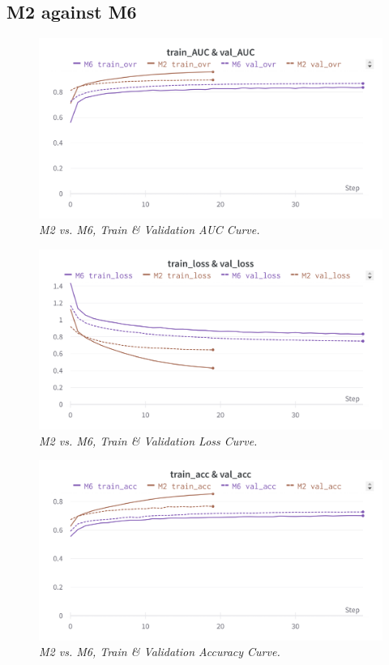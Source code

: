 \subsection{M2 against M6}

\begin{figure}[H]
  \centering
  \includegraphics[width=\textwidth]{imatges/results/AUCM2M6.png}
  \caption[M2 vs. M6, Train \& Validation AUC Curve]{\textit{M2 vs. M6, Train \& Validation AUC Curve. }}
\end{figure}

\newpage

\begin{figure}[H]
  \centering
  \includegraphics[width=\textwidth]{imatges/results/LossM2M6.png}
  \caption[M2 vs. M6, Train \& Validation Loss Curve]{\textit{M2 vs. M6, Train \& Validation Loss Curve. }}
\end{figure}


\begin{figure}[H]
  \centering
  \includegraphics[width=\textwidth]{imatges/results/AccM2M6.png}
  \caption[M2 vs. M6, Train \& Validation Accuracy Curve]{\textit{M2 vs. M6, Train \& Validation Accuracy Curve. }}
\end{figure}

